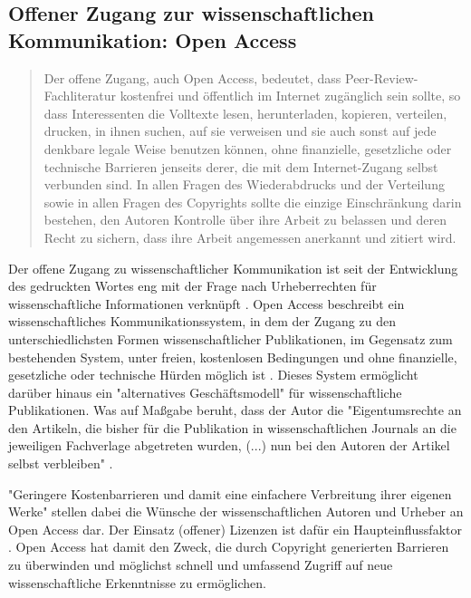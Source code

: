 \subsection{Offener Zugang zur wissenschaftlichen Kommunikation: Open Access}

\begin{quote}
Der offene Zugang, auch Open Access, bedeutet, dass Peer-Review-Fachliteratur kostenfrei und öffentlich im Internet zugänglich sein sollte, so dass Interessenten die Volltexte lesen, herunterladen, kopieren, verteilen, drucken, in ihnen suchen, auf sie verweisen und sie auch sonst auf jede denkbare legale Weise benutzen können, ohne finanzielle, gesetzliche oder technische Barrieren jenseits derer, die mit dem Internet-Zugang selbst verbunden sind. In allen Fragen des Wiederabdrucks und der Verteilung sowie in allen Fragen des Copyrights sollte die einzige Einschränkung darin bestehen, den Autoren Kontrolle über ihre Arbeit zu belassen und deren Recht zu sichern, dass ihre Arbeit angemessen anerkannt und zitiert wird.
\end{quote} \cite{boai_2012}

Der offene Zugang zu wissenschaftlicher Kommunikation ist seit der Entwicklung des gedruckten Wortes eng mit der Frage nach Urheberrechten für wissenschaftliche Informationen verknüpft \cite{Case_2000}. Open Access beschreibt ein wissenschaftliches Kommunikationssystem, in dem der Zugang zu den unterschiedlichsten Formen wissenschaftlicher Publikationen, im Gegensatz zum bestehenden System, unter freien, kostenlosen Bedingungen und ohne finanzielle, gesetzliche oder technische Hürden möglich ist \cite{WD_bundestag_2009}. Dieses System ermöglicht darüber hinaus ein "alternatives Geschäftsmodell"\cite{lewis_2012_inevitability} für wissenschaftliche Publikationen. Was auf Maßgabe beruht, dass der Autor die "Eigentumsrechte an den Artikeln, die bisher für die Publikation in wissenschaftlichen Journals an die jeweiligen Fachverlage abgetreten wurden, (...) nun bei den Autoren der Artikel selbst verbleiben" \cite{Hess_2006}.

"Geringere Kostenbarrieren und damit eine einfachere Verbreitung ihrer eigenen Werke" \cite{WD_bundestag_2009} stellen dabei die Wünsche der wissenschaftlichen Autoren und Urheber an Open Access dar. Der Einsatz (offener) Lizenzen ist dafür ein Haupteinflussfaktor \cite{cite:16}. Open Access hat damit den Zweck, die durch Copyright generierten Barrieren zu überwinden und möglichst schnell und umfassend Zugriff auf neue wissenschaftliche Erkenntnisse zu ermöglichen.

